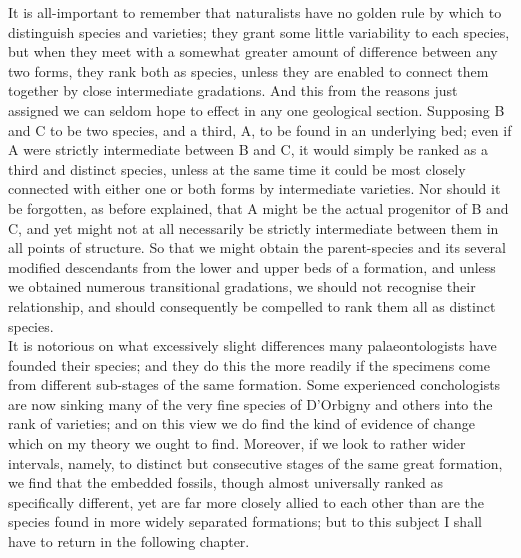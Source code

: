 \indent It is all-important to remember that naturalists have no golden rule by which to distinguish species and varieties; they grant some little variability to each species, but when they meet with a somewhat greater amount of difference between any two forms, they rank both as species, unless they are enabled to connect them together by close intermediate gradations. And this from the reasons just assigned we can seldom hope to effect in any one geological section. Supposing B and C to be two species, and a third, A, to be found in an underlying bed; even if A were strictly intermediate between B and C, it would simply be ranked as a third and distinct species, unless at the same time it could be most closely connected with either one or both forms by intermediate varieties. Nor should it be forgotten, as before explained, that A might be the actual progenitor of B and C, and yet might not at all necessarily be strictly intermediate between them in all points of structure. So that we might obtain the parent-species and its several modified descendants from the lower and upper beds of a formation, and unless we obtained numerous transitional gradations, we should not recognise their relationship, and should consequently be compelled to rank them all as distinct species.\\
\indent It is notorious on what excessively slight differences many palaeontologists have founded their species; and they do this the more readily if the specimens come from different sub-stages of the same formation. Some experienced conchologists are now sinking many of the very fine species of D'Orbigny and others into the rank of varieties; and on this view we do find the kind of evidence of change which on my theory we ought to find.  Moreover, if we look to rather wider intervals, namely, to distinct but consecutive stages of the same great formation, we find that the embedded fossils, though almost universally ranked as specifically different, yet are far more closely allied to each other than are the species found in more widely separated formations; but to this subject I shall have to return in the following chapter.\\
